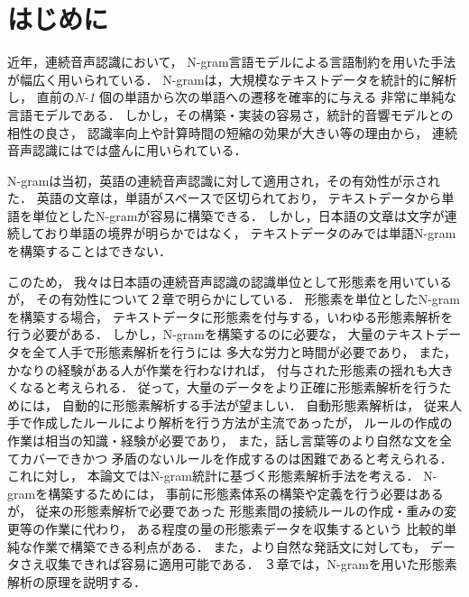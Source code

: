 

\maketitle

\clearpage


\section{はじめに}
近年，連続音声認識において，
N-gram言語モデルによる言語制約を用いた手法が幅広く用いられている．
N-gramは，大規模なテキストデータを統計的に解析し，
直前の{\it N-1} 個の単語から次の単語への遷移を確率的に与える
非常に単純な言語モデルである．
しかし，その構築・実装の容易さ，統計的音響モデルとの相性の良さ，
認識率向上や計算時間の短縮の効果が大きい等の理由から，
連続音声認識にはでは盛んに用いられている\cite{Bahl}\cite{Woodland}．

N-gramは当初，英語の連続音声認識に対して適用され，その有効性が示された．
英語の文章は，単語がスペースで区切られており，
テキストデータから単語を単位としたN-gramが容易に構築できる．
しかし，日本語の文章は文字が連続しており単語の境界が明らかではなく，
テキストデータのみでは単語N-gramを構築することはできない．

このため，
我々は日本語の連続音声認識の認識単位として形態素を用いているが，
その有効性について２章で明らかにしている．
形態素を単位としたN-gramを構築する場合，
テキストデータに形態素を付与する，いわゆる形態素解析を行う必要がある．
しかし，N-gramを構築するのに必要な，
大量のテキストデータを全て人手で形態素解析を行うには
多大な労力と時間が必要であり，
また，かなりの経験がある人が作業を行わなければ，
付与された形態素の揺れも大きくなると考えられる．
従って，大量のデータをより正確に形態素解析を行うためには，
自動的に形態素解析する手法が望ましい．
自動形態素解析は，
従来人手で作成したルールにより解析を行う方法が主流であったが，
ルールの作成の作業は相当の知識・経験が必要であり，
また，話し言葉等のより自然な文を全てカバーできかつ
矛盾のないルールを作成するのは困難であると考えられる．
これに対し，
本論文ではN-gram統計に基づく形態素解析手法を考える．
N-gramを構築するためには，
事前に形態素体系の構築や定義を行う必要はあるが，
従来の形態素解析で必要であった
形態素間の接続ルールの作成・重みの変更等の作業に代わり，
ある程度の量の形態素データを収集するという
比較的単純な作業で構築できる利点がある．
また，より自然な発話文に対しても，
データさえ収集できれば容易に適用可能である．
３章では，N-gramを用いた形態素解析の原理を説明する．

